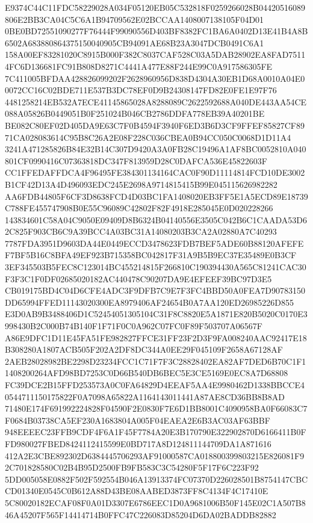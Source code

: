 \documentclass[UTF8,fontset=fandol,zihao=-4,a4paper]{ctexart}
\begin{document}
{{E9374C44C11FDC58229028A034F05120EB05C532818F0259266028B04420516089806E2BB3CA04C5C6A1B94709562E02BCCAA1408007138105F04D01
0BE0BD72551090277F76444F99090556D403BF8382FC1BA6A0402D13E41B4A8B6502A683880864375150040905CB94091AE68B23A3047DCB0491C6A1
158A00EF83281020C8915B000F382C8037CAF528C03A5DAB28902EA8FAD75114FC6D136681FC91B808D8271C4441A477E88F244E99C0A917586305FE
7C411005BFDAA428826099202F2628960956D838D4304A30EB1D68A0010A04E00072CC16C02BDE711E537B3DC78EF0D9B24308147FD82E0FE1E97F76
4481258214EB532A7ECE41145865028A8288089C2622592688A040DE443AA54CE088A05826B0449051B0F251024B046CB2786DDFA778EB39A40201BE
BE082C80EF02D405DA9E63C7F0B4594F3940F6ED3B6D3CF9FFEF85827CF8971CA028083614C95B8C26A2E08F228C036CBEA0B94CC050C0068D1D11A4
3241A471285826B84E32B14C307D9420A3A0FB28C19496A1AF8BC0052810A040801CF0990416C07363818DC347F813959D28C0DAFCA536E45822603F
CC1FFEDAFFDCA4F96495FE384301134164CAC0F90D11114814FCD10DE3002B1CF42D13A4D496093EDC245E2698A9714815415B99E045115626982282
AA6FDB44805F6CF3D8638FCD4D03BC1FA1408020EB3FF5E1A5ECD89E18739C788FE455747908B0E55C96089C42802F82F4918E285045E0D020228266
143834601C58A04C9050E09409D8B6324B04140556E3505C042B6C1CAADA53D62C825F903CB6C9A39BCC4A03BC31A14080203B3CA2A02880A7C40293
7787FDA3951D9603DA44E0449ECCD3478623FDB7BEF5ADE60B88120AFEFEF7BF5B16C8BFA49EF923B715358BC042817F31A9B5B9EC37E35489E0B3CF
3EF345503B5FEC8C123014BC455214815F266810C190394430A565C81241CAC30F3F3C1F0DF02685020182AC440478C90207DA9E4EFEEF39BC97D3E5
CB019175BD4C04D6CFE4ADC3F9DFB7C9E7F3FC4BBD50A0FEA7D90783150DD65994FFED11143020300EA8979406AF24654B0A7AA120ED26985226D855
E3D0AB9B3488406D1C52454051305104C31F8C8820E5A1871E820B5020C0170E3998430B2C000B74B140F1F71F0C0A962C07FC0F89F503707A06567F
A86E9DFC1D11E45FA51FE982827FFCE31FF23F2D3F9FA008240AAC92417E18B308280A1807ACB505F202A2DF8DC344A0EE29F045109F2658A67128AF
2AEB28028982BE2298D23234FCC1C71F7F3C28828402EA82AF7DED6B70C1F11408200264AFD98BD7253C0D66B540DB6BEC5E3CE5169E0EC8A7D68808
FC39DCE2B15FFD253573A0C0FA64829D4EEAF5AA4E9980462D1338BBCCE40544711150175822F0A7098A65822A1164143011441A87AE8CD36BB8B8AD
71480E174F691992224828F04590F2E0830F7E6D1BB8001C4090958BA0F66083C7F0684B03738CA5EF230A1683804A005F04EAEA2E6B3AC03AF63BBF
948EEEEC23FFB9CDF4F6A1F45F7784A20E3B170790E322902870D6166411B0FFD980027FBED8424112415599E0BD717A8D124811144709DA1A871616
412A2E3CBE892302D6384445706293AF91000587CA018800399803215E826081F92C701828580C02B4B95D2500FB9FB583C3C54280F5F17F6C223F92
5DD005058E0882F502F592554B046A13913374FC07370D226028501B8754147CBCCD01340E0545C0B612A88D43BE08AABED3873FF8C4134F4C17410E
5C80020182ECAF08F0A01D3307E6786EEC1D0A9681006B50F145E02C1A507B846A45207F565F14414714B0FFC47C226083D85204D6DA02BADDB82882
}}
\end{document}
